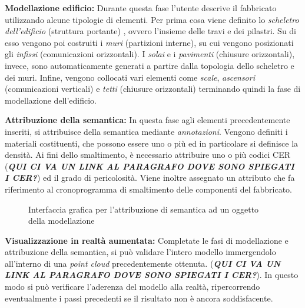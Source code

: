 \noindent \textbf{Modellazione edificio:} Durante questa fase l'utente descrive il fabbricato utilizzando alcune tipologie di elementi. Per prima cosa viene definito lo \textit{scheletro dell'edificio} (struttura portante) , ovvero l'insieme delle travi e dei pilastri. Su di esso vengono poi costruiti i \textit{muri} (partizioni interne), su cui vengono posizionati gli \textit{infissi} (comunicazioni orizzontali). I \textit{solai} e i \textit{pavimenti} (chiusure orizzontali), invece, sono automaticamente generati a partire dalla topologia dello scheletro e dei muri. Infine, vengono collocati vari elementi come \textit{scale}, \textit{ascensori} (comunicazioni verticali) e \textit{tetti} (chiusure orizzontali) terminando quindi la fase di modellazione dell'edificio.

\noindent \textbf{Attribuzione della semantica:} In questa fase agli elementi precedentemente inseriti, si attribuisce della semantica mediante \textit{annotazioni}. Vengono definiti i materiali costituenti, che possono essere uno o pi\`u ed in particolare si definisce la densit\`a. Ai fini dello smaltimento, \`e necessario attribuire uno o pi\`u codici CER (\textbf{\textit{QUI CI VA UN LINK AL PARAGRAFO DOVE SONO SPIEGATI I CER?}}) ed il grado di pericolosit\`a. Viene inoltre assegnato un attributo che fa riferimento al cronoprogramma di smaltimento delle componenti del fabbricato.\\

\begin{figure}[!h]
  \centering
   {}
  \caption{Interfaccia grafica per l'attribuzione di semantica ad un oggetto della modellazione}
  \label{fig:example1}
\end{figure}

\noindent \textbf{Visualizzazione in realt\`a aumentata:} Completate le fasi di modellazione e attribuzione della semantica, si pu\`o validare l'intero modello immergendolo all'interno di una \textit{point cloud} precedentemente ottenuta. (\textbf{\textit{QUI CI VA UN LINK AL PARAGRAFO DOVE SONO SPIEGATI I CER?}}). In questo modo si pu\`o verificare l'aderenza del modello alla realt\`a, ripercorrendo eventualmente i passi precedenti se il risultato non \`e ancora soddisfacente.\\

